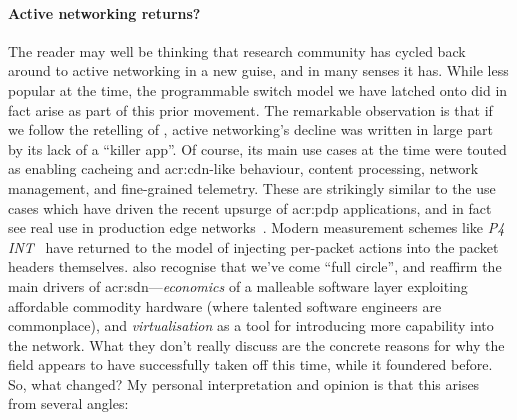 \paragraph{Active networking returns?}
The reader may well be thinking that research community has cycled back around to active networking in a new guise, and in many senses it has.
While less popular at the time, the programmable switch model we have latched onto did in fact arise as part of this prior movement.
The remarkable observation is that if we follow the retelling of \Textcite{DBLP:journals/ccr/FeamsterRZ14}, active networking's decline was written in large part by its lack of a ``killer app''.
Of course, its main use cases at the time were touted as enabling cacheing and \gls{acr:cdn}-like behaviour, content processing, network management, and fine-grained telemetry.
These are strikingly similar to the use cases which have driven the recent upsurge of \gls{acr:pdp} applications, and in fact see real use in production edge networks~\parencite{DBLP:conf/sigcomm/TianGLZCZDYMTLW21}.
Modern measurement schemes like \emph{P4 INT}~\parencite{p4-int} have returned to the model of injecting per-packet actions into the packet headers themselves.
\Textcite{DBLP:journals/ccr/WetherallT19} also recognise that we've come ``full circle'', and reaffirm the main drivers of \gls{acr:sdn}---\emph{economics} of a malleable software layer exploiting affordable commodity hardware (where talented software engineers are commonplace), and \emph{virtualisation} as a tool for introducing more capability into the network.
What they don't really discuss are the concrete reasons for why the field appears to have successfully taken off this time, while it foundered before.
So, what changed?
My personal interpretation and opinion is that this arises from several angles: 
